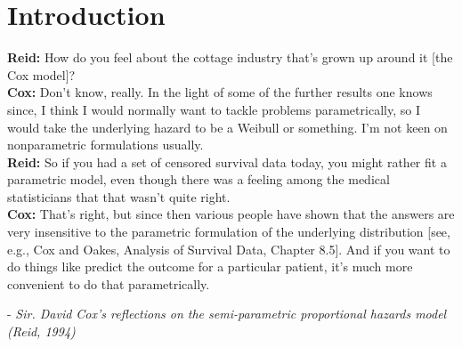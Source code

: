 
\chapter{Introduction}
\label{ch:Introduction}

\begin{flushleft}
    \textbf{Reid:} How do you feel about the cottage industry that’s grown up around it [the Cox model]?
    \\
\textbf{Cox:} Don’t know, really. In the light of some of the further results one knows since, I think I would normally want to tackle problems parametrically, so I would take the underlying hazard to be a Weibull or something. I’m not keen on nonparametric formulations usually.
\\
\textbf{Reid:} So if you had a set of censored survival data today, you might rather fit a parametric model, even though there was a feeling among the medical statisticians that that wasn’t quite right.
\\
\textbf{Cox:} That’s right, but since then various people have shown that the answers are very insensitive to the parametric formulation of the underlying distribution [see, e.g., Cox and Oakes, Analysis of Survival Data, Chapter 8.5]. And if you want to do things like predict the outcome for a particular patient, it’s much more convenient to do that parametrically.

- \textit{Sir. David Cox's reflections on the semi-parametric proportional hazards model (Reid, 1994)}
\end{flushleft}

